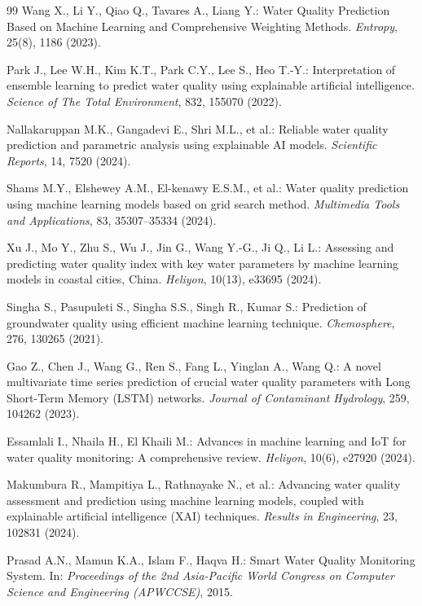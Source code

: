 \documentclass[12pt,a4paper]{report}
\numberwithin{table}{chapter}
\numberwithin{figure}{chapter}
\begin{document}
\begin{thebibliography}{99}
Wang X., Li Y., Qiao Q., Tavares A., Liang Y.:
Water Quality Prediction Based on Machine Learning and Comprehensive Weighting Methods.
\textit{Entropy}, 25(8), 1186 (2023).

Park J., Lee W.H., Kim K.T., Park C.Y., Lee S., Heo T.-Y.:
Interpretation of ensemble learning to predict water quality using explainable artificial intelligence.
\textit{Science of The Total Environment}, 832, 155070 (2022).

Nallakaruppan M.K., Gangadevi E., Shri M.L., et al.:
Reliable water quality prediction and parametric analysis using explainable AI models.
\textit{Scientific Reports}, 14, 7520 (2024).

Shams M.Y., Elshewey A.M., El-kenawy E.S.M., et al.:
Water quality prediction using machine learning models based on grid search method.
\textit{Multimedia Tools and Applications}, 83, 35307--35334 (2024).

Xu J., Mo Y., Zhu S., Wu J., Jin G., Wang Y.-G., Ji Q., Li L.:
Assessing and predicting water quality index with key water parameters by machine learning models in coastal cities, China.
\textit{Heliyon}, 10(13), e33695 (2024).

Singha S., Pasupuleti S., Singha S.S., Singh R., Kumar S.:
Prediction of groundwater quality using efficient machine learning technique.
\textit{Chemosphere}, 276, 130265 (2021).

Gao Z., Chen J., Wang G., Ren S., Fang L., Yinglan A., Wang Q.:
A novel multivariate time series prediction of crucial water quality parameters with Long Short-Term Memory (LSTM) networks.
\textit{Journal of Contaminant Hydrology}, 259, 104262 (2023).

Essamlali I., Nhaila H., El Khaili M.:
Advances in machine learning and IoT for water quality monitoring: A comprehensive review.
\textit{Heliyon}, 10(6), e27920 (2024).

Makumbura R., Mampitiya L., Rathnayake N., et al.:
Advancing water quality assessment and prediction using machine learning models, coupled with explainable artificial intelligence (XAI) techniques.
\textit{Results in Engineering}, 23, 102831 (2024).

Prasad A.N., Mamun K.A., Islam F., Haqva H.:
Smart Water Quality Monitoring System.
In: \textit{Proceedings of the 2nd Asia-Pacific World Congress on Computer Science and Engineering (APWCCSE)}, 2015.

\end{thebibliography}
\end{document}

